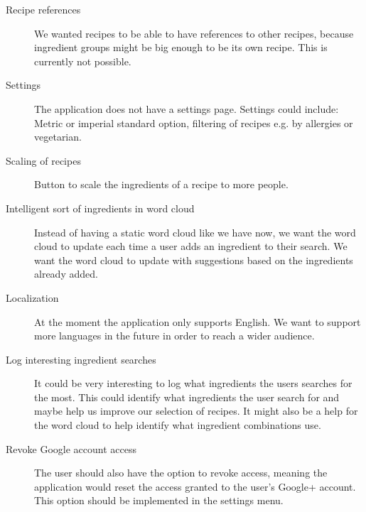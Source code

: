 \begin{description}
\item[Recipe references] We wanted recipes to be able to have references to other recipes, because ingredient groups might be big enough to be its own recipe. This is currently not possible.

\item[Settings] The application does not have a settings page. Settings could include: Metric or imperial standard option, filtering of recipes e.g. by allergies or vegetarian.

\item[Scaling of recipes] Button to scale the ingredients of a recipe to more people.

\item [Intelligent sort of ingredients in word cloud] Instead of having a static word cloud like we have now, we want the word cloud to update each time a user adds an ingredient to their search. We want the word cloud to update with suggestions based on the ingredients already added. 

\item [Localization] At the moment the application only supports English. We want to support more languages in the future in order to reach a wider audience.
\item [Log interesting ingredient searches] It could be very interesting to log what ingredients the users searches for the most. This could identify what ingredients the user search for and maybe help us improve our selection of recipes. It might also be a help for the word cloud to help identify what ingredient combinations use.
\item [Revoke Google account access]
The user should also have the option to revoke access, meaning the application would reset the access granted to the user's Google+ account.
This option should be implemented in the settings menu.
\end{description}

